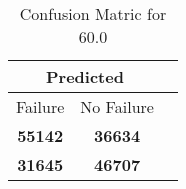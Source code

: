 \begin{table}[] 
\label{Table: Prediction Accuracy-DMD60.0OnlySunEKF-ignoreReflection-Reflection} 
\caption{Confusion Matric for 60.0} 
\centering 
\begin{tabular} 
 {@{}ccc@{}} 
\toprule 
\multicolumn{2}{c}{\textbf{Predicted}}
 \\ \midrule 
\multicolumn{1}{|c|}{Failure} & 
\multicolumn{1}{c|}{No Failure}
 \\ \midrule 
\multicolumn{1}{|c|}{\color{green}\textbf{55142}} & 
\multicolumn{1}{c|}{\color{red}\textbf{36634}}
 \\ \midrule 
\multicolumn{1}{|c|}{\color{red}\textbf{31645}} & 
\multicolumn{1}{c|}{\color{green}\textbf{46707}}
 \\ \bottomrule 
\end{tabular} 
\end{table} 
